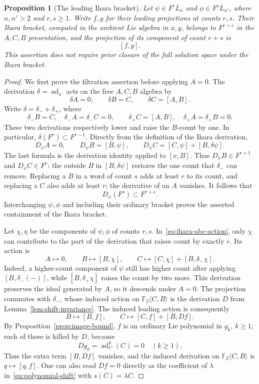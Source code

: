 \documentclass[11pt]{article}
\newcommand{\F}{{\mathbb F_2}}
\DeclareMathOperator{\ad}{ad}
\newtheorem{proposition}[theorem]{Proposition}
\theoremstyle{definition}
\theoremstyle{remark}
\numberwithin{equation}{section}
\begin{document}
\begin{proposition}[The leading Ihara bracket]
\label{prop:leading-ihara}
Let $\psi\in F^r\overline L_n$ and
$\phi\in F^s\overline L_{n'}$, where $n,n'>2$ and $r,s\geq1$.
Write $f,g$ for their leading projections at counts $r,s$.
Their Ihara bracket, computed in the ambient Lie algebra in
$x,y$, belongs to $F^{r+s}$ in the $A,C,B$ presentation, and
the projection of its component of count $r+s$ is
\begin{equation}
 \label{eq:leading-ihara}
 [f,g].
\end{equation}
This assertion does not require prior closure of the full solution
space under the Ihara bracket.
\end{proposition}

\begin{proof}
We first prove the filtration assertion before applying $A=0$.
The derivation $\delta=\ad_x$ acts on the free $A,C,B$ algebra by
\[
 \delta A=0,\qquad \delta B=C,\qquad \delta C=[A,B].
\]
Write $\delta=\delta_-+\delta_+$, where
\[
 \delta_-B=C,\quad \delta_-A=\delta_-C=0,
 \qquad
 \delta_+C=[A,B],\quad \delta_+A=\delta_+B=0.
\]
These two derivations respectively lower and raise the $B$-count
by one.  In particular, $\delta(F^r)\subset F^{r-1}$.
Directly from the definition of the Ihara derivation,
\begin{equation}
 \label{eq:ihara-abc-action}
 D_\psi A=0,\qquad
 D_\psi B=[B,\psi],\qquad
 D_\psi C=[C,\psi]+[B,\delta\psi].
\end{equation}
The last formula is the derivation identity applied to $[x,B]$.
Thus $D_\psi B\in F^{r+1}$ and $D_\psi C\in F^r$:
the outside $B$ in $[B,\delta\psi]$ restores the one count that
$\delta_-$ can remove.  Replacing a $B$ in a word of count $s$
adds at least $r$ to its count, and replacing a $C$ also adds at
least $r$; the derivative of an $A$ vanishes.
It follows that
\[
 D_\psi(F^s)\subset F^{r+s}.
\]
Interchanging $\psi,\phi$ and including their ordinary bracket
proves the asserted containment of the Ihara bracket.

Let $\chi,\eta$ be the components of $\psi,\phi$ of counts
$r,s$.  In~\eqref{eq:ihara-abc-action}, only $\chi$ can contribute
to the part of the derivation that raises count by exactly $r$.
Its action is
\[
 A\longmapsto0,\qquad
 B\longmapsto[B,\chi],\qquad
 C\longmapsto[C,\chi]+[B,\delta_-\chi].
\]
Indeed, a higher-count component of $\psi$ still has higher count
after applying $[B,\delta_-(-)]$, while
$[B,\delta_+\chi]$ raises the count by two more.
This derivation preserves the ideal generated by $A$, so it
descends under $A=0$.
The projection commutes with $\delta_-$, whose induced action
on $\F\langle C,B\rangle$ is the derivation $D$ from
Lemma~\ref{lem:shift-invariance}.
The induced leading action is consequently
\[
 B\longmapsto[B,f],\qquad
 C\longmapsto[C,f]+[B,Df].
\]
By Proposition~\ref{prop:image-bound}, $f$ is an ordinary Lie
polynomial in $g_k$, $k\geq1$; each of these is killed by $D$,
because
\[
 Dg_k=\ad_C^k(C)=0\quad(k\geq1).
\]
Thus the extra term $[B,Df]$ vanishes, and the induced derivation
on $\F\langle C,B\rangle$ is $q\mapsto[q,f]$.
One can also read $Df=0$ directly as the coefficient of $\lambda$
in~\eqref{eq:polynomial-shift} with $s(C)=\lambda C$.


\end{proof}
\end{document}
